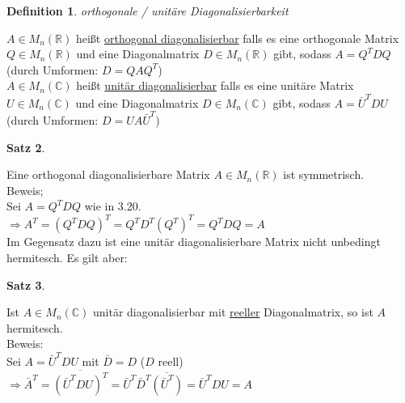\documentclass[a4paper,11pt]{article}
\newtheorem{definition}{Definition}[section]
\newtheorem{satz}[definition]{Satz}
\begin{document}
\begin{definition}
	orthogonale / unitäre Diagonalisierbarkeit
\end{definition}
$A\in M_n(\mathbb{R})$ heißt \underline{orthogonal diagonalisierbar} falls es eine orthogonale Matrix $Q\in M_n(\mathbb{R})$ und eine Diagonalmatrix $D\in M_n(\mathbb{R})$ gibt, sodass $A=Q^TDQ$ \\
(durch Umformen: $D=QAQ^T$) \\
$A\in M_n(\mathbb{C})$ heißt \underline{unitär diagonalisierbar} falls es eine unitäre Matrix $U\in M_n(\mathbb{C})$ und eine Diagonalmatrix $D\in M_n(\mathbb{C})$ gibt, sodass $A=\bar U^TDU$ \\
(durch Umformen: $D=UA\bar U^T$)

\begin{satz}
\end{satz}
Eine orthogonal diagonalisierbare Matrix $A\in M_n(\mathbb{R})$ ist symmetrisch. \\
Beweis; \\
Sei $A=Q^TDQ$ wie in 3.20. \\
$\Rightarrow A^T=(Q^TDQ)^T=Q^TD^T(Q^T)^T=Q^TDQ=A$ \\
Im Gegensatz dazu ist eine unitär diagonalisierbare Matrix nicht unbedingt hermitesch. Es gilt aber: 

\begin{satz}
\end{satz}
Ist $A\in M_n(\mathbb{C})$ unitär diagonalisierbar mit \underline{reeller} Diagonalmatrix, so ist $A$ hermitesch. \\
Beweis: \\
Sei $A=\bar U^TDU$ mit $\bar D=D$ ($D$ reell) \\
$\Rightarrow\bar A^T=\overline{(\bar U^TDU)^T}=\bar U^T\bar D^T\overline{(\bar U^T)}=\bar U^TDU=A$
\end{document}

